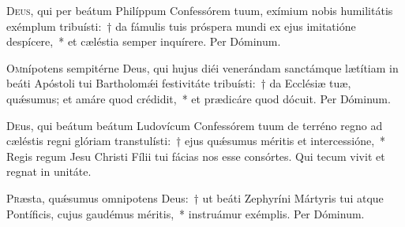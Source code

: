 \documentclass[vesperale_romanum.tex]{subfiles}
\begin{document}
\commsequentis

\myrule


\duplex

\oratio

\lettrine{D}{eus}, qui per beátum Philíppum Confessórem tuum, exímium nobis humilitátis exémplum tribuísti:~† da fámulis tuis próspera mundi ex ejus imitatióne despícere,~* et cæléstia semper inquírere. Per Dóminum.

\vespsequentiscomm

\myrule



\oratio

\lettrine{O}{m}nípotens sempitérne Deus, qui hujus diéi venerándam san\-ctámque lætítiam in beáti Apóstoli tui Bartholomǽi festivitáte tribuísti:~† da Ecclésiæ tuæ, quǽsumus; et amáre quod crédidit,~* et prædicáre quod dócuit. Per Dóminum.

\commsequentis

\myrule
{}
\semiduplex


\oratio

\lettrine{D}{e}us, qui beátum beátum Ludovícum Confessórem tuum de terréno regno ad cæléstis regni glóriam transtulísti:~† ejus quǽsumus méritis et intercessióne,~* Regis regum Jesu Christi Fílii tui fácias nos esse consórtes. Qui tecum vivit et regnat in unitáte.

\vespsequentiscomm

\myrule

\simplex


\oratio

\lettrine{P}{r}æsta, quǽsumus omnipotens Deus:~† ut beáti Zephyríni Mártyris tui atque Pontíficis, cujus gaudémus méritis,~* instruámur exémplis. Per Dóminum.

\vespsequenti
\myrule


\duplexmtv
\end{document}
